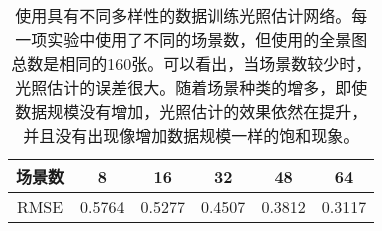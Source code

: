 \begin{table}[htbp]
    \centering
    \caption[数据多样性对光照估计的影响]{
        \label{table:eval-data-diversity}
        使用具有不同多样性的数据训练光照估计网络。每一项实验中使用了不同的场景数，但使用的全景图总数是相同的160张。可以看出，当场景数较少时，光照估计的误差很大。随着场景种类的增多，即使数据规模没有增加，光照估计的效果依然在提升，并且没有出现像增加数据规模一样的饱和现象。
    }
    \begin{tabular}{c|c|c|c|c|c}
        \toprule
    场景数& 8       &  16  & 32  & 48  & 64 \\\hline
    RMSE &  0.5764 & 0.5277 & 0.4507 & 0.3812 & 0.3117\\
        \bottomrule
    \end{tabular}
\end{table}
